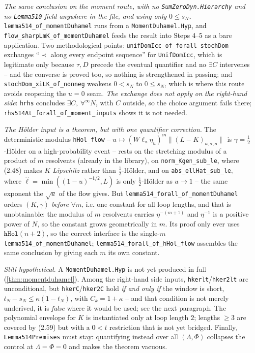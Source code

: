\begin{theorem}
  \emph{The same conclusion on the moment route, with no \texttt{SumZeroDyn.Hierarchy} and no
  \texttt{Lemma510} field anywhere in the file, and using only $0\le s_N$.}
  \texttt{lemma514\_of\_momentDuhamel} runs from a \texttt{MomentDuhamel.Hyp}, and
  \texttt{flow\_sharpLmK\_of\_momentDuhamel} feeds the result into Steps 4--5 as a bare
  application.  Two methodological points: \texttt{unifDomIcc\_of\_forall\_stochDom} exchanges
  ``$\prec$ along every endpoint sequence'' for \texttt{UnifDomIcc}, which is legitimate only
  because $\tau,D$ precede the eventual quantifier and no $\exists C$ intervenes -- and the
  converse is proved too, so nothing is strengthened in passing; and
  \texttt{stochDom\_xiLK\_of\_nonneg} weakens $0<s_N$ to $0\le s_N$, which is where this route
  avoids reopening the $u=0$ seam.  \emph{The exchange does not apply on the right-hand side}:
  \texttt{hrhs} concludes $\exists C,\ \forall^\infty N$, with $C$ outside, so the choice argument
  fails there; \texttt{rhs514At\_forall\_of\_moment\_inputs} shows it is not needed.

  \emph{The H\"older input is a theorem, but with one quantifier correction.} The deterministic
  modulus \texttt{hHol\_flow} -- $u\mapsto(W\ell_u\eta_u)^m\|(L-K)_{u,\sigma,a}\|$ is
  $\gamma=\tfrac12$-H\"older on a high-probability event -- rests on the stretching modulus of a
  product of $m$ resolvents (already in the library), on \texttt{norm\_Kgen\_sub\_le}, where
  (2.48) makes $K$ \emph{Lipschitz} rather than $\tfrac12$-H\"older, and on
  \texttt{abs\_ellHat\_sub\_le}, where $\hat\ell=\min((1-u)^{-1/2},L)$ is only
  $\tfrac12$-H\"older as $u\to1$ -- the same exponent the $\sqrt u$ of the flow gives.  But
  \texttt{lemma514\_forall\_of\_momentDuhamel} orders $(K,\gamma)$ \emph{before} $\forall m$, i.e.
  one constant for all loop lengths, and that is unobtainable: the modulus of $m$ resolvents
  carries $\eta^{-(m+1)}$ and $\eta^{-1}$ is a positive power of $N$, so the constant grows
  geometrically in $m$.  Its proof only ever uses $\texttt{hHol}(n+2)$, so the correct interface
  is the single-$m$ \texttt{lemma514\_of\_momentDuhamel};
  \texttt{lemma514\_forall\_of\_hHol\_flow} assembles the same conclusion by giving each $m$ its
  own constant.

  \emph{Still hypothetical.}  A \texttt{MomentDuhamel.Hyp} is not yet produced in full
  (\ref{thm:momentduhamel}).  Among the right-hand side inputs, \texttt{hkerlt}/\texttt{hker2lt}
  are unconditional, but \texttt{hkerC}/\texttt{hker2C} hold \emph{if and only if} the window is
  short, $t_N-s_N\le\kappa(1-t_N)$, with $C_k=1+\kappa$ -- and that condition is not merely
  underived, it is \emph{false} where it would be used; see the next paragraph.  The polynomial
  envelope for $K$ is instantiated only at loop length $2$; lengths $\ge3$ are covered by (2.59)
  but with a $0<t$ restriction that is not yet bridged.  Finally, \texttt{Lemma514Premises} must
  stay: quantifying instead over all $(\Lambda,\Phi)$ collapses the control at $\Lambda=\Phi=0$
  and makes the theorem vacuous.


\end{theorem}
